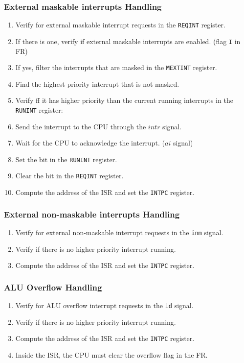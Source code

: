 \begin{frame}
    \frametitle{External maskable interrupts Handling}
    \begin{enumerate}
        \item Verify for external maskable interrupt requests in the \texttt{REQINT} register.
        \item If there is one, verify if external maskable interrupts are enabled. (flag \texttt{I} in FR)
        \item If yes, filter the interrupts that are masked in the \texttt{MEXTINT} register.
        \item Find the highest priority interrupt that is not masked.
        \item Verify ff it has higher priority than the current running interrupts in the \texttt{RUNINT} register:
        \item Send the interrupt to the CPU through the $intr$ signal.
        \item Wait for the CPU to acknowledge the interrupt. ($ai$ signal)
        \item Set the bit in the \texttt{RUNINT} register.
        \item Clear the bit in the \texttt{REQINT} register.
        \item Compute the address of the ISR and set the \texttt{INTPC} register.
    \end{enumerate}
\end{frame}

\begin{frame}
    \frametitle{External non-maskable interrupts Handling}
    \begin{enumerate}
        \item Verify for external non-maskable interrupt requests in the \texttt{inm} signal.
        \item Verify if there is no higher priority interrupt running.
        \item Compute the address of the ISR and set the \texttt{INTPC} register.
    \end{enumerate}
\end{frame}

\begin{frame}
    \frametitle{ALU Overflow Handling}
    \begin{enumerate}
        \item Verify for ALU overflow interrupt requests in the \texttt{id} signal.
        \item Verify if there is no higher priority interrupt running.
        \item Compute the address of the ISR and set the \texttt{INTPC} register.
        \item Inside the ISR, the CPU must clear the  overflow flag in the FR.
    \end{enumerate}
\end{frame}


